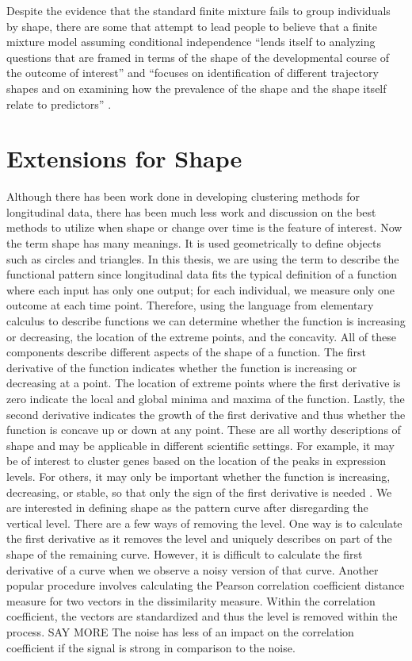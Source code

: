 Despite the evidence that the standard finite mixture fails to group individuals by shape, there are some that attempt to lead people to believe that a finite mixture model assuming conditional independence ``lends itself to analyzing questions that are framed in terms of the shape of the developmental course of the outcome of interest''  and  ``focuses on identification of different trajectory shapes and on examining how the prevalence of the shape and the shape itself relate to predictors'' \cite{nagin}.

\section{Extensions for Shape}
Although there has been work done in developing clustering methods for longitudinal data, there has been much less work and discussion on the best methods to utilize when shape or change over time is the feature of interest. Now the term shape has many meanings. It is used geometrically to define objects such as circles and triangles. In this thesis, we are using the term to describe the functional pattern since longitudinal data fits the typical definition of a function where each input has only one output; for each individual, we measure only one outcome at each time point. Therefore, using the language from elementary calculus to describe functions we can determine whether the function is increasing or decreasing, the location of the extreme points, and the concavity. All of these components describe different aspects of the shape of a function. The first derivative of the function indicates whether the function is increasing or decreasing at a point. The location of extreme points where the first derivative is zero indicate the local and global minima and maxima of the function. Lastly, the second derivative indicates the growth of the first derivative and thus whether the function is concave up or down at any point. These are all worthy descriptions of shape and may be applicable in different scientific settings. For example, it may be of interest to cluster genes based on the location of the peaks in expression levels. For others, it may only be important whether the function is increasing, decreasing, or stable, so that only the sign of the first derivative is needed \cite{phang2003}. We are interested in defining shape as the pattern curve after disregarding the vertical level. There are a few ways of removing the level. One way is to calculate the first derivative as it removes the level and uniquely describes on part of the shape of the remaining curve. However, it is difficult to calculate the first derivative of a curve when we observe a noisy version of that curve. Another popular procedure involves calculating the Pearson correlation coefficient distance measure for two vectors in the dissimilarity measure. Within the correlation coefficient, the vectors are standardized and thus the level is removed within the process. SAY MORE The noise has less of an impact on the correlation coefficient if the signal is strong in comparison to the noise.
